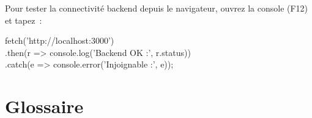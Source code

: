 \documentclass[a4paper,12pt]{article}
\begin{document}
\begin{tcolorbox}[mybox,
    colback=LightPurple, colframe=TipPurple,
    colbacktitle=TipPurple, coltitle=white,
    title={$\star$\enspace Diagnostic r\'eseau rapide}]
Pour tester la connectivit\'e backend depuis le navigateur, ouvrez la console (F12) et tapez~:

\medskip
\begin{minipage}{\linewidth}
\colorbox{CodeBg}{%
  \begin{minipage}{0.96\linewidth}
  \vspace{4pt}
  {\ttfamily\small\color{PrimaryBlue}%
  fetch('http://localhost:3000')\\
  \hspace*{12pt}.then(r => console.log('Backend OK :', r.status))\\
  \hspace*{12pt}.catch(e => console.error('Injoignable :', e));%
  }
  \vspace{4pt}
  \end{minipage}%
}
\end{minipage}
\end{tcolorbox}

\section{Glossaire}
\end{document}
